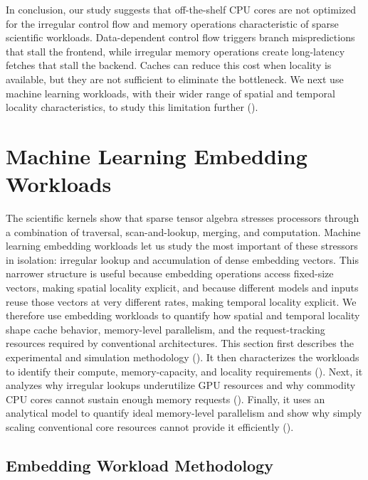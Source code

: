In conclusion, our study suggests that off-the-shelf CPU cores are not optimized for the irregular control flow and memory operations characteristic of sparse scientific workloads. Data-dependent control flow triggers branch mispredictions that stall the frontend, while irregular memory operations create long-latency fetches that stall the backend. Caches can reduce this cost when locality is available, but they are not sufficient to eliminate the bottleneck. We next use machine learning workloads, with their wider range of spatial and temporal locality characteristics, to study this limitation further ().

\section{Machine Learning Embedding Workloads} \label{sec:ml-embedding-workloads} %

The scientific kernels show that sparse tensor algebra stresses processors through a combination of traversal, scan-and-lookup, merging, and computation. Machine learning embedding workloads let us study the most important of these stressors in isolation: irregular lookup and accumulation of dense embedding vectors. This narrower structure is useful because embedding operations access fixed-size vectors, making spatial locality explicit, and because different models and inputs reuse those vectors at very different rates, making temporal locality explicit. We therefore use embedding workloads to quantify how spatial and temporal locality shape cache behavior, memory-level parallelism, and the request-tracking resources required by conventional architectures. This section first describes the experimental and simulation methodology (). It then characterizes the workloads to identify their compute, memory-capacity, and locality requirements (). Next, it analyzes why irregular lookups underutilize GPU resources and why commodity CPU cores cannot sustain enough memory requests (). Finally, it uses an analytical model to quantify ideal memory-level parallelism and show why simply scaling conventional core resources cannot provide it efficiently ().

\subsection{Embedding Workload Methodology} \label{sec:embedding-workload-methodology} %

